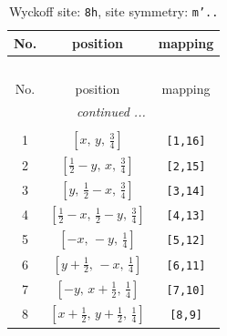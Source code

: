 \documentclass[fleqn,8pt]{jsarticle}
\begin{document}
\begin{longtable}{ccc}
\caption{Wyckoff site: {\tt 8h}, site symmetry: {\tt m'..}}
 \\
 \hline \hline
No. & position & mapping \\ \hline \endfirsthead

\multicolumn{2}{l}{\tablename\ \thetable{}} \\
 \hline \hline
No. & position & mapping \\ \hline \endhead

 \hline \hline
\multicolumn{2}{r}{\footnotesize\it continued ...} \\ \endfoot

 \hline \hline
\multicolumn{2}{r}{} \\ \endlastfoot

1 & $\left[ x,\, y,\, \frac{3}{4} \right]$ & {\tt [1,16]} \\ \hline
2 & $\left[ \frac{1}{2} - y,\, x,\, \frac{3}{4} \right]$ & {\tt [2,15]} \\ \hline
3 & $\left[ y,\, \frac{1}{2} - x,\, \frac{3}{4} \right]$ & {\tt [3,14]} \\ \hline
4 & $\left[ \frac{1}{2} - x,\, \frac{1}{2} - y,\, \frac{3}{4} \right]$ & {\tt [4,13]} \\ \hline
5 & $\left[ - x,\, - y,\, \frac{1}{4} \right]$ & {\tt [5,12]} \\ \hline
6 & $\left[ y + \frac{1}{2},\, - x,\, \frac{1}{4} \right]$ & {\tt [6,11]} \\ \hline
7 & $\left[ - y,\, x + \frac{1}{2},\, \frac{1}{4} \right]$ & {\tt [7,10]} \\ \hline
8 & $\left[ x + \frac{1}{2},\, y + \frac{1}{2},\, \frac{1}{4} \right]$ & {\tt [8,9]} \\
\end{longtable}
\renewcommand{\arraystretch}{1.2}
\end{document}
